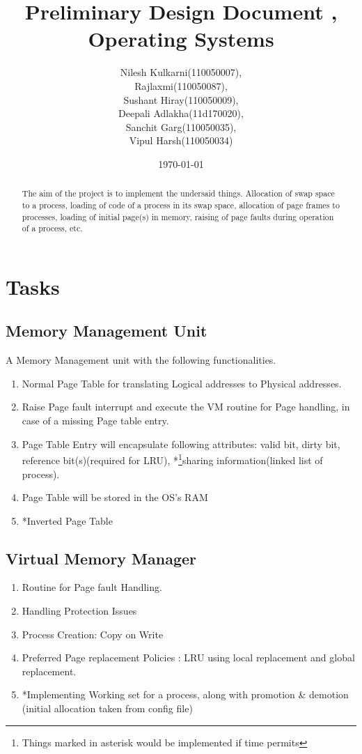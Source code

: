\documentclass[a4paper]{article}
\title{Preliminary Design Document , Operating Systems}
\author{Nilesh Kulkarni(110050007), \\Rajlaxmi(110050087), \\Sushant Hiray(110050009), \\Deepali Adlakha(11d170020), \\Sanchit Garg(110050035), \\Vipul Harsh(110050034)}
\date{\today}
\begin{document}
\maketitle

\begin{abstract}
The aim of the project is to implement the undersaid things. Allocation of swap space to a process, loading of code of a process in its swap space, allocation of page frames to processes, loading of initial page(s) in memory, raising of page faults during operation of a process, etc.
\end{abstract}



\section{Tasks}


\subsection{Memory Management Unit}
 A Memory Management unit with the following functionalities.
    \begin{enumerate}
        \item Normal Page Table for translating Logical addresses to Physical addresses. 
        \item Raise Page fault interrupt and execute the VM routine for Page handling, in case of a missing Page table entry.
        \item Page Table Entry will encapsulate following attributes: valid bit, dirty bit, reference bit(s)(required for LRU), *\footnote{Things marked in asterisk would be implemented if time permits}sharing information(linked list of process).      
        \item Page Table will be stored in the OS's RAM 
        \item *Inverted Page Table
    \end{enumerate}
   
   
\subsection{Virtual Memory Manager}
   \begin{enumerate}
        \item Routine for Page fault Handling.
        \item Handling Protection Issues
        \item Process Creation: Copy on Write
        \item Preferred Page replacement Policies : LRU using local replacement and global replacement.
        \item *Implementing Working set for a process, along with promotion \& demotion (initial allocation taken from config file)
        
   \end{enumerate}
  
\end{document}
